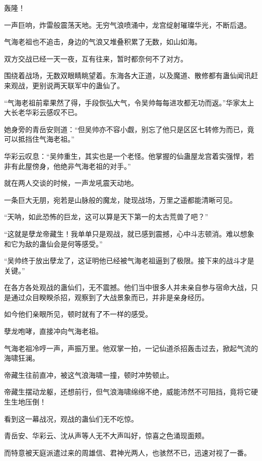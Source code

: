 
\begin{this_body}

轰隆！

一声巨响，炸雷般震荡天地。无穷气浪喷涌中，龙宫绽射璀璨华光，不断后退。

气海老祖也不追击，身边的气浪又堆叠积累了无数，如山如海。

双方交战已经一天一夜，互有往来，暂时都奈何不了对方。

围绕着战场，无数双眼睛眺望着。东海各大正道，以及魔道、散修都有蛊仙闻讯赶来观战，更别说两天联军中的蛊仙了。

“气海老祖前辈果然了得，手段恢弘大气，令吴帅每每进攻都无功而返。”华家太上大长老华彩云感叹不已。

她身旁的青岳安则道：“但吴帅亦不容小觑，别忘了他只是区区七转修为而已，竟可以抵挡住气海老祖。”

华彩云叹息：“吴帅重生，其实也是一个老怪。他掌握的仙蛊屋龙宫着实强悍，若非有此屋傍身，他绝非气海老祖的对手。”

就在两人交谈的时候，一声龙吼震天动地。

一条巨大无朋，宛若是山脉般的魔龙，陡现战场，万里之遥都能清晰可见。

“天呐，如此恐怖的巨龙，这可以算是天下第一的太古荒兽了吧？”

“这就是孽龙帝藏生！我单单只是观战，就已感到震撼，心中斗志顿消。难以想象和它为敌的蛊仙会是何等感受。”

“吴帅终于放出孽龙了，这证明他已经被气海老祖逼到了极限。接下来的战斗才是关键。”

在各方各处观战的蛊仙们，无不震撼。他们当中很多人并未亲自参与宿命大战，只是通过众目睽睽杀招，观察到了大战景象而已，并非是亲身经历。

如今他们亲眼所见，顿时就有了不一样的感受。

孽龙咆哮，直接冲向气海老祖。

气海老祖冷哼一声，声振万里。他双掌一拍，一记仙道杀招轰击过去，掀起气流的海啸狂澜。

帝藏生往前直冲，被这气浪海啸一撞，顿时冲势顿止。

帝藏生摆动龙躯，还想前行，但气浪海啸绵绵不绝，威能沛然不可阻挡，竟将它硬生生地压倒！

看到这一幕战况，观战的蛊仙们无不吃惊。

青岳安、华彩云、沈从声等人无不大声叫好，惊喜之色涌现面颊。

而特意被天庭派遣过来的周雄信、君神光两人，也骇然不已，迅速对视了一番。


\end{this_body}
